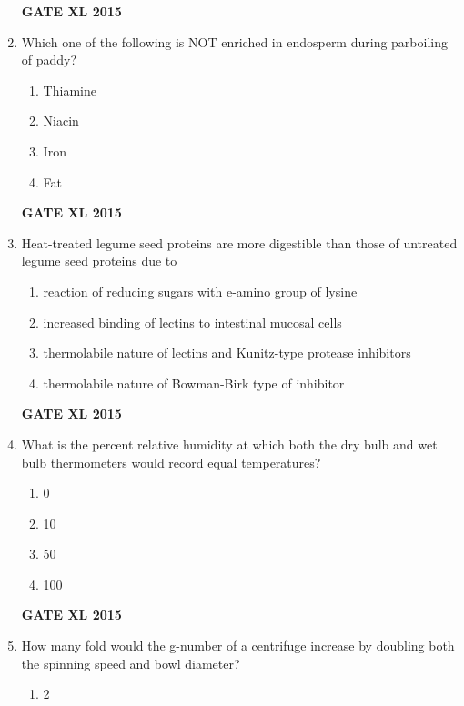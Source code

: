 \documentclass[journal,12pt,onecolumn]{IEEEtran}
\begin{document}
\begin{enumerate}
\begin{enumerate}
    \end{enumerate}
\begin{flushright}\textbf{GATE XL 2015}\end{flushright}
\item Which one of the following is NOT enriched in endosperm during parboiling of paddy?
    \begin{enumerate}
            \item Thiamine
	    \item Niacin
	    \item Iron
            \item Fat
    \end{enumerate}
\begin{flushright}\textbf{GATE XL 2015}\end{flushright}
\item Heat-treated legume seed proteins are more digestible than those of untreated legume seed proteins due to
    \begin{enumerate}
            \item reaction of reducing sugars with e-amino group of lysine
	    \item increased binding of lectins to intestinal mucosal cells
	    \item thermolabile nature of lectins and Kunitz-type protease inhibitors 
            \item thermolabile nature of Bowman-Birk type of inhibitor
    \end{enumerate}
\begin{flushright}\textbf{GATE XL 2015}\end{flushright}
\item What is the percent relative humidity at which both the dry bulb and wet bulb thermometers would record equal temperatures?
    \begin{enumerate}
            \item 0
	    \item 10
	    \item 50
            \item 100
    \end{enumerate}
\begin{flushright}\textbf{GATE XL 2015}\end{flushright}
\item How many fold would the g-number of a centrifuge increase by doubling both the spinning speed and bowl diameter?
    \begin{enumerate}
            \item 2

\end{enumerate}
\end{enumerate}
\end{document}
